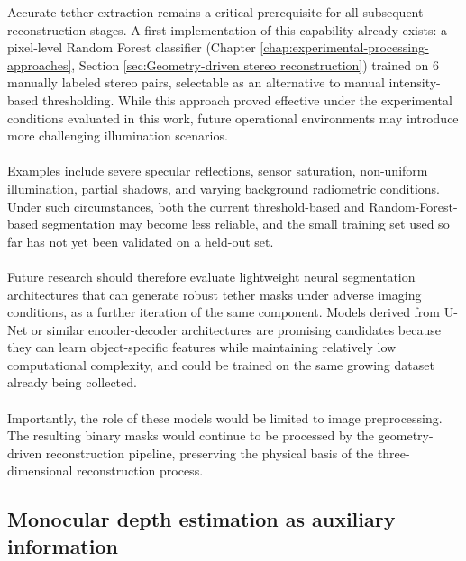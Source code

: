 Accurate tether extraction remains a critical prerequisite for all subsequent reconstruction stages. A first implementation of this capability already exists: a pixel-level Random Forest classifier (Chapter \ref{chap:experimental-processing-approaches}, Section \ref{sec:Geometry-driven stereo reconstruction}) trained on 6 manually labeled stereo pairs, selectable as an alternative to manual intensity-based thresholding. While this approach proved effective under the experimental conditions evaluated in this work, future operational environments may introduce more challenging illumination scenarios.
\\\\
Examples include severe specular reflections, sensor saturation, non-uniform illumination, partial shadows, and varying background radiometric conditions. Under such circumstances, both the current threshold-based and Random-Forest-based segmentation may become less reliable, and the small training set used so far has not yet been validated on a held-out set.
\\\\
Future research should therefore evaluate lightweight neural segmentation architectures that can generate robust tether masks under adverse imaging conditions, as a further iteration of the same component. Models derived from U-Net or similar encoder-decoder architectures are promising candidates because they can learn object-specific features while maintaining relatively low computational complexity, and could be trained on the same growing dataset already being collected.
\\\\
Importantly, the role of these models would be limited to image preprocessing. The resulting binary masks would continue to be processed by the geometry-driven reconstruction pipeline, preserving the physical basis of the three-dimensional reconstruction process.

\subsection{Monocular depth estimation as auxiliary information}

